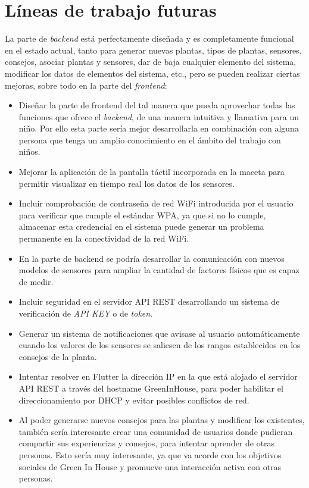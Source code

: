 \section{Líneas de trabajo futuras}
La parte de \textit{backend} está perfectamente diseñada y es completamente funcional en el estado actual, tanto para generar nuevas plantas, tipos de plantas, sensores, consejos, asociar plantas y sensores, dar de baja cualquier elemento del sistema, modificar los datos de elementos del sistema, etc., pero se pueden realizar ciertas mejoras, sobre todo en la parte del \textit{frontend}:
\begin{itemize}
    \item Diseñar la parte de frontend del tal manera que pueda aprovechar todas las funciones que ofrece el \textit{backend}, de una manera intuitiva y llamativa para un niño. Por ello esta parte sería mejor desarrollarla en combinación con alguna persona que tenga un amplio conocimiento en el ámbito del trabajo con niños. 
    \item Mejorar la aplicación de la pantalla táctil incorporada en la maceta para permitir visualizar en tiempo real los datos de los sensores.
    \item Incluir comprobación de contraseña de red WiFi introducida por el usuario para verificar que cumple el estándar WPA, ya que si no lo cumple, almacenar esta credencial en el sistema puede generar un problema permanente en la conectividad de la red WiFi.
    \item En la parte de backend se podría desarrollar la comunicación con nuevos modelos de sensores para ampliar la cantidad de factores físicos que es capaz de medir.
    \item Incluir seguridad en el servidor API REST desarrollando un sistema de verificación de \textit{API KEY} o de \textit{token}.
    \item Generar un sistema de notificaciones que avisase al usuario automáticamente cuando los valores de los sensores se saliesen de los rangos establecidos en los consejos de la planta.
    \item Intentar resolver en Flutter la dirección IP en la que está alojado el servidor API REST a través del hostname GreenInHouse, para poder habilitar el direccionamiento por DHCP y evitar posibles conflictos de red.
    \item Al poder generarse nuevos consejos para las plantas y modificar los existentes, también sería interesante crear una comunidad de usuarios donde pudieran compartir sus experiencias y consejos, para intentar aprender de otras personas. Esto sería muy interesante, ya que va acorde con los objetivos sociales de Green In House y promueve una interacción activa con otras personas.

\end{itemize}
